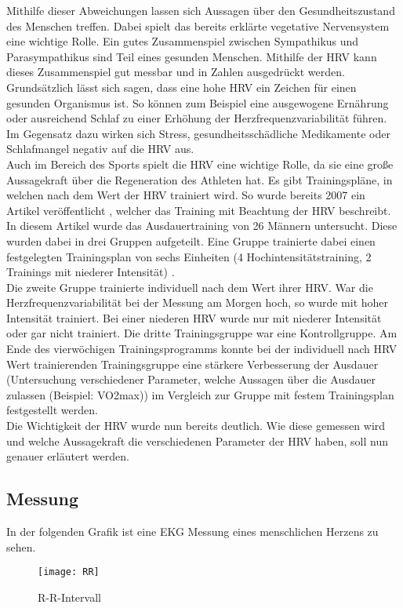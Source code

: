 Mithilfe dieser Abweichungen lassen sich Aussagen über den Gesundheitszustand des Menschen treffen. Dabei spielt das bereits erklärte vegetative Nervensystem eine wichtige Rolle. Ein gutes Zusammenspiel zwischen Sympathikus und Parasympathikus sind Teil eines gesunden Menschen. Mithilfe der \acs{HRV} kann dieses Zusammenspiel gut messbar und \glqq in Zahlen ausgedrückt werden\grqq{}. 
Grundsätzlich lässt sich sagen, dass eine hohe \acs{HRV} ein Zeichen für einen gesunden Organismus ist. So können zum Beispiel eine ausgewogene Ernährung oder ausreichend Schlaf zu einer Erhöhung der Herzfrequenzvariabilität führen. Im Gegensatz dazu wirken sich Stress, gesundheitsschädliche Medikamente oder Schlafmangel negativ auf die \acs{HRV} aus.\cite{hrv} \\
Auch im Bereich des Sports spielt die \acs{HRV} eine wichtige Rolle, da sie eine große Aussagekraft über die Regeneration des Athleten hat. Es gibt Trainingspläne, in welchen nach dem Wert der \acs{HRV} trainiert wird. So wurde bereits 2007 ein Artikel veröffentlicht \cite{sport}, welcher das Training mit Beachtung der \acs{HRV} beschreibt. In diesem Artikel wurde das Ausdauertraining von 26 Männern untersucht. Diese wurden dabei in drei Gruppen aufgeteilt. Eine Gruppe trainierte dabei einen festgelegten Trainingsplan von sechs Einheiten (4 Hochintensitätstraining, 2 Trainings mit niederer Intensität) .\\
Die zweite Gruppe trainierte individuell nach dem Wert ihrer \acs{HRV}. War die Herzfrequenzvariabilität bei der Messung am Morgen hoch, so wurde mit hoher Intensität trainiert. Bei einer niederen \acs{HRV} wurde nur mit niederer Intensität oder gar nicht trainiert. Die dritte Trainingsgruppe war eine Kontrollgruppe. 
Am Ende des vierwöchigen Trainingsprogramms konnte bei der individuell nach \acs{HRV} Wert trainierenden Trainingsgruppe eine stärkere Verbesserung der Ausdauer (Untersuchung verschiedener Parameter, welche Aussagen über die Ausdauer zulassen (Beispiel: VO2max)) im Vergleich zur Gruppe mit festem Trainingsplan festgestellt werden.\cite{sport}\\

Die Wichtigkeit der \acs{HRV} wurde nun bereits deutlich. Wie diese gemessen wird und welche Aussagekraft die verschiedenen Parameter der \acs{HRV} haben, soll nun genauer erläutert werden.

\subsection{Messung}
In der folgenden Grafik ist eine \acs{EKG} Messung eines menschlichen Herzens zu sehen.
\begin{figure}[H]
    \centering
    \texttt{[image: RR]}
    \caption{R-R-Intervall}
    \label{fig:R-R-Intervall}
    \cite{rrbild}
\end{figure}

